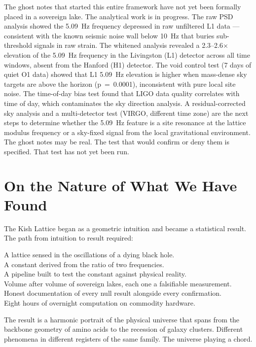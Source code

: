 \documentclass[11pt, letterpaper, openany]{book}
\begin{document}
The ghost notes that started this entire framework have not yet been formally placed in a sovereign lake.
The analytical work is in progress. The raw PSD analysis showed the 5.09~Hz frequency depressed in raw unfiltered L1 data --- consistent with the known seismic noise wall below 10~Hz that buries sub-threshold signals in raw strain.
The whitened analysis revealed a 2.3--2.6$\times$ elevation of the 5.09~Hz frequency in the Livingston (L1) detector across all time windows, absent from the Hanford (H1) detector.
The void control test (7 days of quiet O1 data) showed that L1 5.09~Hz elevation is higher when mass-dense sky targets are above the horizon (p~=~0.0001), inconsistent with pure local site noise.
The time-of-day bias test found that LIGO data quality correlates with time of day, which contaminates the sky direction analysis.
A residual-corrected sky analysis and a multi-detector test (VIRGO, different time zone) are the next steps to determine whether the 5.09~Hz feature is a site resonance at the lattice modulus frequency or a sky-fixed signal from the local gravitational environment.
The ghost notes may be real. The test that would confirm or deny them is specified.
That test has not yet been run.

\section*{On the Nature of What We Have Found}

The Kish Lattice began as a geometric intuition and became a statistical result.
The path from intuition to result required:

A lattice sensed in the oscillations of a dying black hole.\\
A constant derived from the ratio of two frequencies.\\
A pipeline built to test the constant against physical reality.\\
Volume after volume of sovereign lakes, each one a falsifiable measurement.\\
Honest documentation of every null result alongside every confirmation.\\
Eight hours of overnight computation on commodity hardware.

The result is a harmonic portrait of the physical universe that spans from the backbone geometry of amino acids to the recession of galaxy clusters.
Different phenomena in different registers of the same family. The universe playing a chord.
\end{document}
